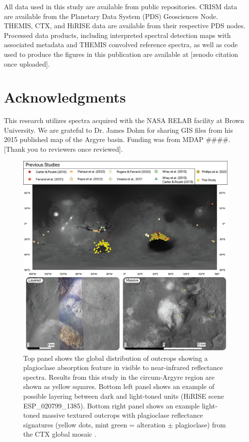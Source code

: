 \documentclass[11pt]{article}
\begin{document}
All data used in this study are available from public repositories. CRISM data are available from the Planetary Data System (PDS) Geosciences Node. THEMIS, CTX, and HiRISE data are available from their respective PDS nodes. Processed data products, including interpreted spectral detection maps with associated metadata and THEMIS convolved reference spectra, as well as code used to produce the figures in this publication are available at [zenodo citation once uploaded].

\section*{Acknowledgments}

This research utilizes spectra acquired with the NASA RELAB facility at Brown University. We are grateful to Dr. James Dohm for sharing GIS files from his 2015 published map of the Argyre basin. Funding was from MDAP \#\#\#\#. [Thank you to reviewers once reviewed].

 
 

\newpage

\begin{figure}
    \centering
    \includegraphics[width=\textwidth]
    {figures/01_Global_Context.png}
    \caption{Top panel shows the global distribution of outcrops showing a plagioclase absorption feature in visible to near-infrared reflectance spectra. Results from this study in the circum-Argyre region are shown as yellow squares. Bottom left panel shows an example of possible layering between dark and light-toned units (HiRISE scene ESP\_020799\_1385). Bottom right panel shows an example light-toned massive textured outcrops with plagioclase reflectance signatures (yellow dots, mint green = alteration $\pm$ plagioclase) from the CTX global mosaic \citep{Dickson2018}.}
    \label{fig:global_distribution}
\end{figure}
\end{document}

